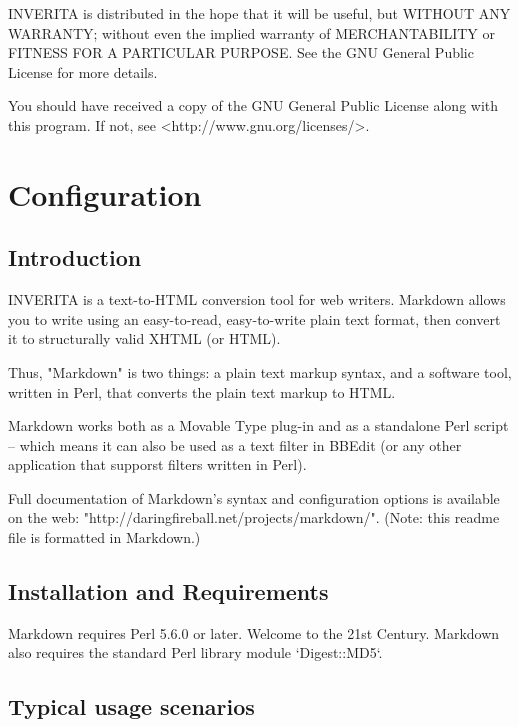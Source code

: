 INVERITA is distributed in the hope that it will be useful,
but WITHOUT ANY WARRANTY; without even the implied warranty of
MERCHANTABILITY or FITNESS FOR A PARTICULAR PURPOSE.  See the
GNU General Public License for more details.

You should have received a copy of the GNU General Public License
along with this program.  If not, see <http://www.gnu.org/licenses/>.



\chapter{Configuration}

\section{Introduction}
INVERITA is a text-to-HTML conversion tool for web writers. Markdown
allows you to write using an easy-to-read, easy-to-write plain text
format, then convert it to structurally valid XHTML (or HTML).

Thus, "Markdown" is two things: a plain text markup syntax, and a
software tool, written in Perl, that converts the plain text markup 
to HTML.

Markdown works both as a Movable Type plug-in and as a standalone Perl
script -- which means it can also be used as a text filter in BBEdit
(or any other application that supporst filters written in Perl).

Full documentation of Markdown's syntax and configuration options is
available on the web: "http://daringfireball.net/projects/markdown/".
(Note: this readme file is formatted in Markdown.)



\section{Installation and Requirements}

Markdown requires Perl 5.6.0 or later. Welcome to the 21st Century.
Markdown also requires the standard Perl library module `Digest::MD5`. 


\section{Typical usage scenarios}

